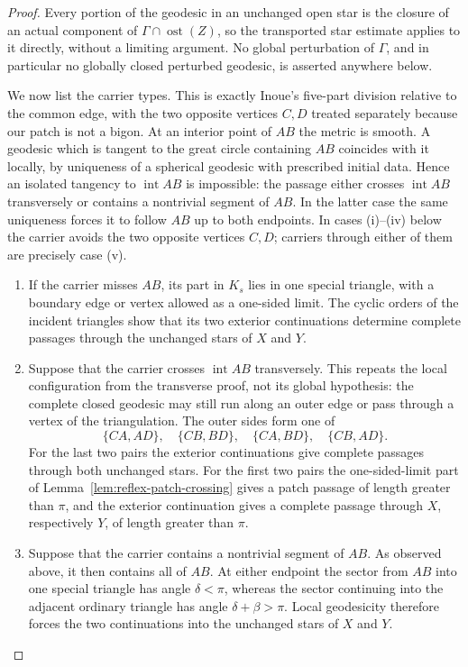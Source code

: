 \documentclass[12pt,a4paper]{article}
\theoremstyle{definition}
\begin{document}
\begin{proof}
Every portion of the geodesic in an unchanged open star is the closure of an
actual component of \(\Gamma\cap\operatorname{ost}(Z)\), so the transported
star estimate applies to it directly, without a limiting argument.  No global
perturbation of \(\Gamma\), and in particular no globally closed perturbed
geodesic, is asserted anywhere below.

We now list the carrier types.  This is exactly Inoue's five-part division
relative to the common edge, with the two opposite vertices \(C,D\) treated
separately because our patch is not a bigon.  At an interior point of \(AB\) the
metric is smooth.  A geodesic which is tangent to the great circle containing
\(AB\) coincides with it locally, by uniqueness of a spherical geodesic with
prescribed initial data.  Hence an isolated tangency to
\(\operatorname{int}AB\) is impossible: the passage either crosses
\(\operatorname{int}AB\) transversely or contains a nontrivial segment of
\(AB\).  In the latter case the same uniqueness forces it to follow \(AB\)
up to both endpoints.
In cases \textup{(i)}--\textup{(iv)} below the carrier avoids the two opposite
vertices \(C,D\); carriers through either of them are precisely case
\textup{(v)}.

\begin{enumerate}[label=\textup{(\roman*)},itemsep=0.35em,topsep=0.4em]
\item If the carrier misses \(AB\), its part in \(K_s\) lies in one special
triangle, with a boundary edge or vertex allowed as a one-sided limit.  The
cyclic orders of the incident triangles show that its two exterior
continuations determine complete passages through the unchanged stars of
\(X\) and \(Y\).

\item Suppose that the carrier crosses \(\operatorname{int}AB\)
transversely.  This repeats the local configuration from the transverse proof,
not its global hypothesis: the complete closed geodesic may still run along an
outer edge or pass through a vertex of the triangulation.  The outer sides form
one of
\[
 \{CA,AD\},\quad \{CB,BD\},\quad
 \{CA,BD\},\quad \{CB,AD\}.
\]
For the last two pairs the exterior continuations give complete passages
through both unchanged stars.  For the first two pairs the one-sided-limit
part of Lemma~\ref{lem:reflex-patch-crossing} gives a patch passage of length
greater than \(\pi\), and the exterior continuation gives a complete passage
through \(X\), respectively \(Y\), of length greater than \(\pi\).

\item Suppose that the carrier contains a nontrivial segment of \(AB\).
As observed above, it then contains all of \(AB\).  At either endpoint the
sector from \(AB\) into one special triangle has angle
\(\delta<\pi\), whereas the sector continuing into the adjacent ordinary
triangle has angle \(\delta+\beta>\pi\).  Local geodesicity therefore forces
the two continuations into the unchanged stars of \(X\) and \(Y\).


\end{enumerate}
\end{proof}
\end{document}
